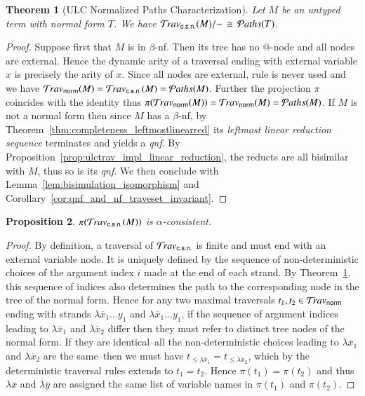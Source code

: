 \documentclass{elsarticle}
\theoremstyle{plain}
\newtheorem{theorem}{Theorem}[section]
\newtheorem{proposition}[theorem]{Proposition}
\theoremstyle{definition}
\newcommand{\normalizing}{{\sf norm}}
\newcommand{\travsetnorm}{\travset_\normalizing} %
\newcommand{\travsetscn}{\travset_{\sf c.s.n.}} %
\def\structisomorphic{\cong} %
\def\coresymbol{\pi} %
\newcommand{\core}[1]{\coresymbol(#1)} %
\newcommand\pathset{{\mathcal{P}aths}} %
\begin{document}
\begin{theorem}[ULC Normalized Paths Characterization]
\label{thm:path_charact_ulc}
Let $M$ be an untyped term with normal form $T$. We have
$\travsetscn(M)/{\sim} \, \structisomorphic\, \pathset(T)$.
\end{theorem}
\begin{proof}
Suppose first that $M$ is in $\beta$-nf. Then its tree has no $@$-node and all nodes are external.
Hence the dynamic arity of a traversal ending with external variable $x$ is precisely the arity of $x$. Since all nodes are external,
rule  is never used and we have
$\travsetnorm(M) = \travsetscn(M) = \pathset(M)$. Further
the projection $\coresymbol$ coincides with the identity thus $\core{\travsetnorm(M)} = \travsetnorm(M) = \pathset(M)$.
%
If $M$ is not a normal form then since $M$ has a $\beta$-nf, by Theorem~\ref{thm:completeness_leftmostlinearred} its \emph{leftmost linear reduction sequence} terminates and yields a \emph{qnf}.
By Proposition~\ref{prop:ulctrav_impl_linear_reduction},
the reducts are all bisimilar with $M$, thus so is its \emph{qnf}.
We then conclude with Lemma~\ref{lem:bisimulation_isomorphism}
and Corollary~\ref{cor:qnf_and_nf_traveset_invariant}.
\end{proof}

\begin{proposition}
    \label{prop:core_travsetnorm_alpha_consistent}
    $\core{\travsetscn(M)}$ is $\alpha$-consistent.
\end{proposition}
\begin{proof}
By definition, a traversal of $\travsetscn$
is finite and must end with an external variable node.
It is uniquely defined by the sequence of non-deterministic choices of the argument index $i$ made at the end of each strand. By Theorem~\ref{thm:path_charact_ulc}, this sequence of indices also determines the path to the corresponding node in the tree of the normal form.
Hence for any two maximal traversals $t_1,t_2 \in \travsetnorm$
ending with strands $\lambda\overline{x}_1 \ldots y_1$ and
$\lambda\overline{x}_1 \ldots y_1$, if the sequence of argument indices leading to $\lambda\overline{x}_1$ and $\lambda\overline{x}_2$ differ then they must refer to distinct tree nodes of the normal form.
If they are identical--all the non-deterministic choices leading to $\lambda\overline{x}_1$ and $\lambda\overline{x}_2$ are the same--then we must have $t_{\leq \lambda\overline{x}_1} = t_{\leq \lambda\overline{x}_2}$, which by the deterministic
traversal rules extends to $t_1 = t_2$.
Hence $\core{t_1} = \core{t_2}$ and thus $\lambda\overline{x}$
and $\lambda\overline{y}$ are assigned the same list of variable names in
$\core{t_1}$ and $\core{t_2}$.
\end{proof}
\end{document}

